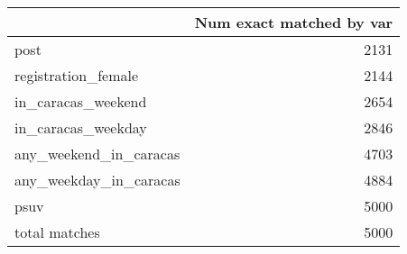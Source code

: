 \begin{tabular}{lr}
\toprule
{} &  Num exact matched by var \\
\midrule
post                   &                      2131 \\
registration\_female    &                      2144 \\
in\_caracas\_weekend     &                      2654 \\
in\_caracas\_weekday     &                      2846 \\
any\_weekend\_in\_caracas &                      4703 \\
any\_weekday\_in\_caracas &                      4884 \\
psuv                   &                      5000 \\
total matches          &                      5000 \\
\bottomrule
\end{tabular}
